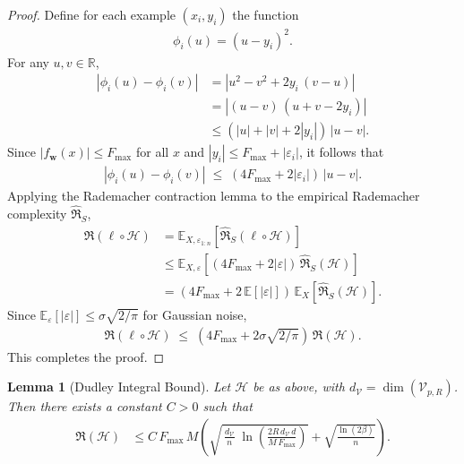 \documentclass{article}
\theoremstyle{plain}
\newtheorem{lemma}[theorem]{Lemma}
\theoremstyle{definition}
\theoremstyle{remark}
\begin{document}
\begin{proof}
Define for each example $(x_i,y_i)$ the function
\begin{align*}
\phi_i(u) = (u - y_i)^2.
\end{align*}
For any $u,v\in\mathbb{R}$,
\begin{align*}
\left|\phi_i(u) - \phi_i(v)\right|
&= \left|u^2 - v^2 + 2y_i\,(v - u)\right|\nonumber\\
&= \left|(u - v)\,(u + v - 2y_i)\right|\nonumber\\
&\le \left(|u| + |v| + 2|y_i|\right)\,\left|u - v\right|.
\end{align*}
Since $|f_{\bm w}(x)|\le F_{\max}$ for all $x$ and $|y_i|\le F_{\max} + |\varepsilon_i|$, it follows that
\begin{align*}
\left|\phi_i(u) - \phi_i(v)\right|
\;\le\;
\left(4F_{\max} + 2|\varepsilon_i|\right)\,\left|u - v\right|.
\end{align*}
Applying the Rademacher contraction lemma to the empirical Rademacher complexity $\widehat{\mathfrak{R}}_{S}$,
\begin{align*}
\mathfrak{R}(\ell\circ\mathcal{H})
&= \mathbb{E}_{X,\varepsilon_{1:n}}\left[\widehat{\mathfrak{R}}_{S}(\ell\circ\mathcal{H})\right]\nonumber\\
&\le \mathbb{E}_{X,\varepsilon}\left[(4F_{\max} + 2|\varepsilon|)\,\widehat{\mathfrak{R}}_{S}(\mathcal{H})\right]\nonumber\\
&= \left(4F_{\max} + 2\,\mathbb{E}[|\varepsilon|]\right)\,
   \mathbb{E}_{X}\left[\widehat{\mathfrak{R}}_{S}(\mathcal{H})\right].
\end{align*}
Since $\mathbb{E}_{\varepsilon}[|\varepsilon|]\le\sigma\sqrt{2/\pi}$ for Gaussian noise,
\begin{align*}
\mathfrak{R}(\ell\circ\mathcal{H})
\;\le\;
\left(4F_{\max} + 2\sigma\sqrt{2/\pi}\right)\,
\mathfrak{R}(\mathcal{H}).
\end{align*}
This completes the proof.  
\end{proof}

\begin{lemma}[Dudley Integral Bound]
\label{lem:dudley_rad}
Let $\mathcal{H}$ be as above, with $d_{\mathcal{V}} = \dim(\mathcal{V}_{p,R})$.  Then there exists a constant $C>0$ such that
\begin{align*}
\mathfrak{R}(\mathcal{H})
&\le
C\,F_{\max}\,M
\left(
\sqrt{\,\frac{d_{\mathcal{V}}}{n}\;\ln\left(\frac{2R\,d_{\mathcal{V}}\,d}{M\,F_{\max}}\right)}
+\sqrt{\frac{\ln(2\beta)}{n}}
\right).
\end{align*}
\end{lemma}
\end{document}

